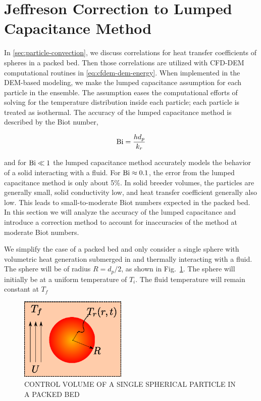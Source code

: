 \section{Jeffreson Correction to Lumped Capacitance Method}\label{sec:ht-jeffreson-correction}
In \cref{sec:particle-convection}, we discuss correlations for heat transfer coefficients of spheres in a packed bed. Then those correlations are utilized with CFD-DEM computational routines in \cref{eq:cfdem-dem-energy}. When implemented in the DEM-based modeling, we make the lumped capacitance assumption for each particle in the ensemble. The assumption eases the computational efforts of solving for the temperature distribution inside each particle; each particle is treated as isothermal. The accuracy of the lumped capacitance method is described by the Biot number,

\begin{equation}
     \mathrm{Bi} = \frac{hd_p}{k_r}
\end{equation} 

and for $\mathrm{Bi} \ll 1$ the lumped capacitance method accurately models the behavior of a solid interacting with a fluid. For $\mathrm{Bi} \approx 0.1$, the error from the lumped capacitance method is only about 5\%. In solid breeder volumes, the particles are generally small, solid conductivity low, and heat transfer coefficient generally also low. This leads to small-to-moderate Biot numbers expected in the packed bed. In this section we will analyze the accuracy of the lumped capacitance and introduce a correction method to account for inaccuracies of the method at moderate Biot numbers.

We simplify the case of a packed bed and only consider a single sphere with volumetric heat generation submerged in and thermally interacting with a fluid. The sphere will be of radius $R=d_p/2$, as shown in Fig.~\ref{fig:ParticleControlVolume}. The sphere will initially be at a uniform temperature of $T_i$. The fluid temperature will remain constant at $T_f$

\begin{figure}[ht]
	\centering
		\includegraphics[width=2in]{chapters/figures/ParticleControlVolume}
	\caption[Control volume of single spherical particle in a packed bed]{CONTROL VOLUME OF A SINGLE SPHERICAL PARTICLE IN A PACKED BED}
	\label{fig:ParticleControlVolume}
\end{figure}



